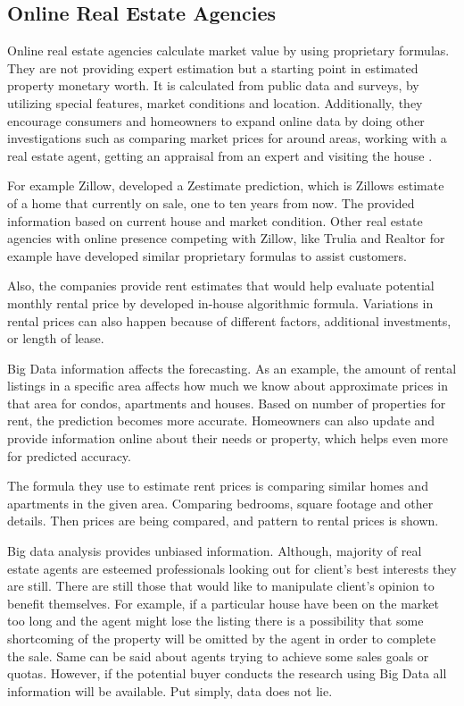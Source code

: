 \documentclass[sigconf]{acmart}
\begin{document}
\subsection{Online Real Estate Agencies}

Online real estate agencies calculate market value by using proprietary formulas. They are not providing expert estimation but a starting point in estimated property monetary worth. It is calculated from public data and surveys, by utilizing special features, market conditions and location. Additionally, they encourage consumers and homeowners to expand online data by doing other investigations such as comparing market prices for around areas, working with a real estate agent, getting an appraisal from an expert and visiting the house \cite{zestimate}.

For example Zillow, developed a Zestimate prediction\cite{zestimate}, which is Zillow\textquotesingle s estimate of a home that currently on sale, one to ten years from now. The provided information based on current house and market condition. Other real estate agencies with online presence competing with Zillow, like Trulia and Realtor for example have developed similar proprietary formulas to assist customers.

Also, the companies provide rent estimates that would help evaluate potential monthly rental price by developed in-house algorithmic formula. Variations in rental prices can also happen because of different factors, additional investments, or length of lease.

Big Data information affects the forecasting. As an example, the amount of rental listings in a specific area affects how much we know about approximate prices in that area for condos, apartments and houses. Based on number of properties for rent, the prediction becomes more accurate.  Homeowners can also update and provide information online about their needs or property, which helps even more for predicted accuracy.

The formula they use to estimate rent prices is comparing similar homes and apartments in the given area. Comparing bedrooms, square footage and other details. Then prices are being compared, and pattern to rental prices is shown.

Big data analysis provides unbiased information.  Although, majority of real estate agents are esteemed professionals looking out for client’s best interests they are still. There are still those that would like to manipulate client’s opinion to benefit themselves. For example, if a particular house have been on the market too long and the agent might lose the listing there is a possibility that some shortcoming of the property will be omitted by the agent in order to complete the sale. Same can be said about agents trying to achieve some sales goals or quotas. However, if the potential buyer conducts the research using Big Data all information will be available. Put simply, data does not lie.
\end{document}
